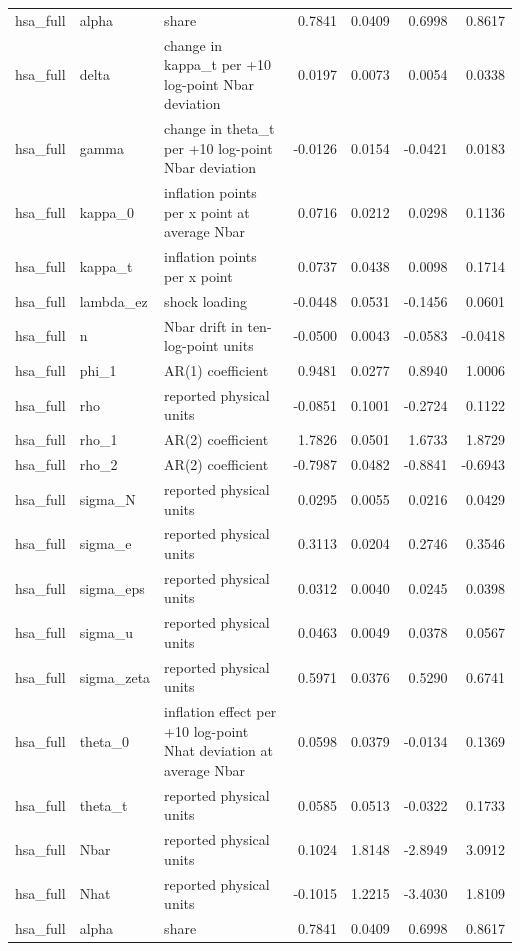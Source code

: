 \begin{tabular}{lllrrrr}
hsa\_full & alpha & share & 0.7841 & 0.0409 & 0.6998 & 0.8617 \\
hsa\_full & delta & change in kappa\_t per +10 log-point Nbar deviation & 0.0197 & 0.0073 & 0.0054 & 0.0338 \\
hsa\_full & gamma & change in theta\_t per +10 log-point Nbar deviation & -0.0126 & 0.0154 & -0.0421 & 0.0183 \\
hsa\_full & kappa\_0 & inflation points per x point at average Nbar & 0.0716 & 0.0212 & 0.0298 & 0.1136 \\
hsa\_full & kappa\_t & inflation points per x point & 0.0737 & 0.0438 & 0.0098 & 0.1714 \\
hsa\_full & lambda\_ez & shock loading & -0.0448 & 0.0531 & -0.1456 & 0.0601 \\
hsa\_full & n & Nbar drift in ten-log-point units & -0.0500 & 0.0043 & -0.0583 & -0.0418 \\
hsa\_full & phi\_1 & AR(1) coefficient & 0.9481 & 0.0277 & 0.8940 & 1.0006 \\
hsa\_full & rho & reported physical units & -0.0851 & 0.1001 & -0.2724 & 0.1122 \\
hsa\_full & rho\_1 & AR(2) coefficient & 1.7826 & 0.0501 & 1.6733 & 1.8729 \\
hsa\_full & rho\_2 & AR(2) coefficient & -0.7987 & 0.0482 & -0.8841 & -0.6943 \\
hsa\_full & sigma\_N & reported physical units & 0.0295 & 0.0055 & 0.0216 & 0.0429 \\
hsa\_full & sigma\_e & reported physical units & 0.3113 & 0.0204 & 0.2746 & 0.3546 \\
hsa\_full & sigma\_eps & reported physical units & 0.0312 & 0.0040 & 0.0245 & 0.0398 \\
hsa\_full & sigma\_u & reported physical units & 0.0463 & 0.0049 & 0.0378 & 0.0567 \\
hsa\_full & sigma\_zeta & reported physical units & 0.5971 & 0.0376 & 0.5290 & 0.6741 \\
hsa\_full & theta\_0 & inflation effect per +10 log-point Nhat deviation at average Nbar & 0.0598 & 0.0379 & -0.0134 & 0.1369 \\
hsa\_full & theta\_t & reported physical units & 0.0585 & 0.0513 & -0.0322 & 0.1733 \\
hsa\_full & Nbar & reported physical units & 0.1024 & 1.8148 & -2.8949 & 3.0912 \\
hsa\_full & Nhat & reported physical units & -0.1015 & 1.2215 & -3.4030 & 1.8109 \\
hsa\_full & alpha & share & 0.7841 & 0.0409 & 0.6998 & 0.8617 \\

\end{tabular}

